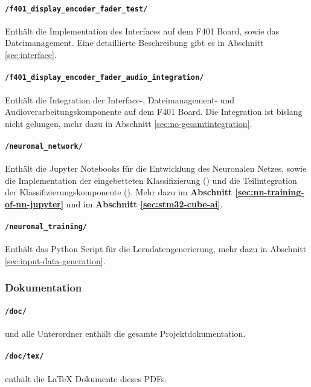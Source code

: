 \paragraph{\texttt{/f401\_display\_encoder\_fader\_test/}}

Enthält die Implementation des Interfaces auf dem F401 Board, sowie das Dateimanagement. Eine detaillierte Beschreibung gibt es in Abschnitt \ref{sec:interface}.

\paragraph{\texttt{/f401\_display\_encoder\_fader\_audio\_integration/}}

Enthält die Integration der Interface-, Dateimanagement- und Audioverarbeitungskomponente auf dem F401 Board. Die Integration ist bislang nicht gelungen, mehr dazu in Abschnitt \ref{sec:no-gesamtintegration}.

\paragraph{\texttt{/neuronal\_network/}}

Enthält die Jupyter Notebooks für die Entwicklung des Neuronalen Netzes, sowie die Implementation der eingebetteten Klassifizierung () und die Teilintegration der Klassifizierungskomponente (). Mehr dazu im \textbf{Abschnitt \ref{sec:nn-training-of-nn-jupyter}} und im \textbf{Abschnitt \ref{sec:stm32-cube-ai}}.

\paragraph{\texttt{/neuronal\_training/}}

Enthält das Python Script für die Lerndatengenerierung, mehr dazu in Abschnitt \ref{sec:input-data-generation}.

\subsubsection{Dokumentation}

\paragraph{\texttt{/doc/}} und alle Unterordner enthält die gesamte Projektdokumentation.

\paragraph{\texttt{/doc/tex/}} enthält die LaTeX Dokumente dieses PDFs.

